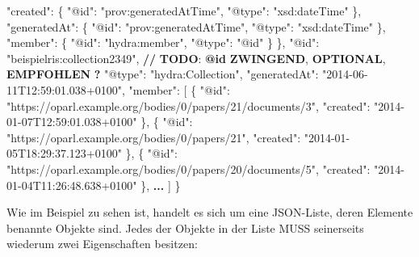\documentclass[,a4paper]{article}
\newenvironment{Shaded}{}{}
\newcommand{\DataTypeTok}[1]{\textcolor[rgb]{0.56,0.13,0.00}{{#1}}}
\newcommand{\StringTok}[1]{\textcolor[rgb]{0.25,0.44,0.63}{{#1}}}
\newcommand{\OtherTok}[1]{\textcolor[rgb]{0.00,0.44,0.13}{{#1}}}
\newcommand{\FunctionTok}[1]{\textcolor[rgb]{0.02,0.16,0.49}{{#1}}}
\newcommand{\ErrorTok}[1]{\textcolor[rgb]{1.00,0.00,0.00}{\textbf{{#1}}}}
\begin{document}
\begin{Shaded}
\begin{Highlighting}[]
                \DataTypeTok{"created"}\FunctionTok{:} \FunctionTok{\{}
                        \DataTypeTok{"@id"}\FunctionTok{:} \StringTok{"prov:generatedAtTime"}\FunctionTok{,}
                        \DataTypeTok{"@type"}\FunctionTok{:} \StringTok{"xsd:dateTime"}
                \FunctionTok{\},}
        \DataTypeTok{"generatedAt"}\FunctionTok{:} \FunctionTok{\{}
                        \DataTypeTok{"@id"}\FunctionTok{:} \StringTok{"prov:generatedAtTime"}\FunctionTok{,}
                        \DataTypeTok{"@type"}\FunctionTok{:} \StringTok{"xsd:dateTime"}
                \FunctionTok{\},}
                \DataTypeTok{"member"}\FunctionTok{:} \FunctionTok{\{} \DataTypeTok{"@id"}\FunctionTok{:} \StringTok{"hydra:member"}\FunctionTok{,} \DataTypeTok{"@type"}\FunctionTok{:} \StringTok{"@id"} \FunctionTok{\}}
        \FunctionTok{\},}
        \DataTypeTok{"@id"}\FunctionTok{:} \StringTok{"beispielris:collection2349"}\FunctionTok{,}
\ErrorTok{//} \ErrorTok{TODO}\FunctionTok{:} \ErrorTok{@id} \ErrorTok{ZWINGEND}\FunctionTok{,} \ErrorTok{OPTIONAL}\FunctionTok{,} \ErrorTok{EMPFOHLEN} \ErrorTok{?}
        \DataTypeTok{"@type"}\FunctionTok{:} \StringTok{"hydra:Collection"}\FunctionTok{,}
        \DataTypeTok{"generatedAt"}\FunctionTok{:} \StringTok{"2014-06-11T12:59:01.038+0100"}\FunctionTok{,}
        \DataTypeTok{"member"}\FunctionTok{:} \OtherTok{[}
        \FunctionTok{\{}
            \DataTypeTok{"@id"}\FunctionTok{:} \StringTok{"https://oparl.example.org/bodies/0/papers/21/documents/3"}\FunctionTok{,}
            \DataTypeTok{"created"}\FunctionTok{:} \StringTok{"2014-01-07T12:59:01.038+0100"}
        \FunctionTok{\}}\OtherTok{,}
            \FunctionTok{\{}
                \DataTypeTok{"@id"}\FunctionTok{:} \StringTok{"https://oparl.example.org/bodies/0/papers/21"}\FunctionTok{,}
                \DataTypeTok{"created"}\FunctionTok{:} \StringTok{"2014-01-05T18:29:37.123+0100"}
            \FunctionTok{\}}\OtherTok{,}
            \FunctionTok{\{}
                \DataTypeTok{"@id"}\FunctionTok{:} \StringTok{"https://oparl.example.org/bodies/0/papers/20/documents/5"}\FunctionTok{,}
                \DataTypeTok{"created"}\FunctionTok{:} \StringTok{"2014-01-04T11:26:48.638+0100"}
            \FunctionTok{\}}\OtherTok{,}
\ErrorTok{...}
    \OtherTok{]}
\FunctionTok{\}}
\end{Highlighting}
\end{Shaded}

Wie im Beispiel zu sehen ist, handelt es sich um eine JSON-Liste, deren
Elemente benannte Objekte sind. Jedes der Objekte in der Liste MUSS
seinerseits wiederum zwei Eigenschaften besitzen:
\end{document}
